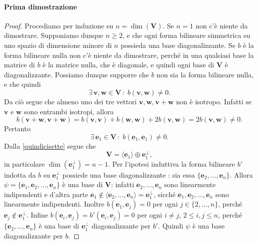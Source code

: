 \documentclass{article}
\theoremstyle{plain}
\theoremstyle{definition}
\theoremstyle{remark}
\begin{document}
\paragraph{Prima dimostrazione}
\begin{proof}
Procediamo per induzione su $n = \dim(\mathbf{V})$. Se $n = 1$ non c'è niente da dimostrare. Supponiamo dunque 
$n \geq 2$, e che ogni forma bilineare simmetrica su uno spazio di dimensione minore di $n$ possieda una base 
diagonalizzante. Se $b$ è la forma bilineare nulla non c'è niente da dimostrare, perché in una qualsiasi base 
la matrice di $b$ è la matrice nulla, che è diagonale, e quindi ogni base di $\mathbf{V}$ è diagonalizzante. Possiamo 
dunque supporre che $b$ non sia la forma bilineare nulla, e che quindi 
\[\exists\,\mathbf{v}, \mathbf{w} \in \mathbf{V}\,:\;b(\mathbf{v}, \mathbf{w}) \neq 0.\]
Da ciò segue che almeno uno dei tre vettori $\mathbf{v},\mathbf{w},\mathbf{v} + \mathbf{w}$ 
non è isotropo.
Infatti se $\mathbf{v}$ e $\mathbf{w}$ sono entrambi isotropi, allora
\[b(\mathbf{v} + \mathbf{w}, \mathbf{v} + \mathbf{w}) = b(\mathbf{v}, \mathbf{v}) + b(\mathbf{w}, \mathbf{w}) + 2b(\mathbf{v},\mathbf{w}) = 2b(\mathbf{v},\mathbf{w}) \neq 0.\]
Pertanto 
\[\exists\,\mathbf{e}_1 \in \mathbf{V}\,:\;b(\mathbf{e}_1, \mathbf{e}_1) \neq 0. \]
Dalla \ref{quindicisette} segue che
\[\mathbf{V} = \langle \mathbf{e}_1 \rangle \oplus \mathbf{e}_1^\perp,\]
in particolare $\dim(\mathbf{e}_1^\perp) = n - 1$. Per l'ipotesi induttiva la forma bilineare $b'$ indotta da 
$b$ su $\mathbf{e}_1^\perp$ possiede una base diagonalizzante : sia essa $\{\mathbf{e}_2, \ldots, \mathbf{e}_n\}$. Allora 
$\psi = \{\mathbf{e}_1, \mathbf{e}_2, \ldots, \mathbf{e}_n\}$ è una base di $\mathbf{V}$: infatti $\mathbf{e}_2, \ldots, \mathbf{e}_n$ 
sono linearmente indipendenti e d'altra parte $\mathbf{e}_1\notin\langle\mathbf{e}_2, \ldots, \mathbf{e}_n\rangle=\mathbf{e}_1^\perp$,  
sicché $\mathbf{e}_1, \mathbf{e}_2, \ldots, \mathbf{e}_n$ sono linearmente indipendenti.
Inoltre $b(\mathbf{e}_1, \mathbf{e}_j) = 0$ per ogni $j \in \{2, \ldots, n\}$, perché $\mathbf{e}_j\notin\mathbf{e}_1^\perp$.
Infine  $b(\mathbf{e}_i, \mathbf{e}_j) = b'(\mathbf{e}_i, \mathbf{e}_j) = 0$ per ogni $i \neq j$, $2 \leq i, j \leq n$, perché $\{\mathbf{e}_2, \ldots, \mathbf{e}_n\}$ 
è una base di $\mathbf{e}_1^\perp$ diagonalizzante per $b'$. Quindi $\psi$ è una base diagonalizzante per $b$.    
\end{proof}

\vspace{10pt}
\end{document}

